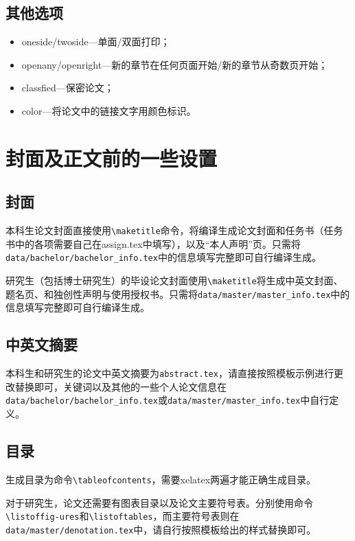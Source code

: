 \subsection{其他选项}
    \begin{itemize}
        \item oneside\slash twoside---单面\slash 双面打印；
        \item openany\slash openright---新的章节在任何页面开始\slash 新的章节从奇数页开始；
        \item classfied---保密论文；
        \item color---将论文中的链接文字用颜色标识。
    \end{itemize}

\section{封面及正文前的一些设置}
\subsection{封面}
本科生论文封面直接使用\texttt{\textbackslash maketitle}命令，将编译生成论文封面和任务书（任务书中的各项需要自己在assign.tex中填写），以及“本人声明”页。只需将\texttt{data/bachelor/bachelor\_info.tex}中的信息填写完整即可自行编译生成。

研究生（包括博士研究生）的毕设论文封面使用\texttt{\textbackslash maketitle}将生成中英文封面、题名页、和独创性声明与使用授权书。只需将\texttt{data/master/master\_info.tex}中的信息填写完整即可自行编译生成。

\subsection{中英文摘要}
本科生和研究生的论文中英文摘要为\texttt{abstract.tex}，请直接按照模板示例进行更改替换即可，关键词以及其他的一些个人论文信息在\texttt{data/bachelor/bachelor\_info.tex}或\texttt{data/master/master\_info.tex}中自行定义。

\subsection{目录}
生成目录为命令\texttt{\textbackslash tableofcontents}，需要xelatex两遍才能正确生成目录。

对于研究生，论文还需要有图表目录以及论文主要符号表。分别使用命令\texttt{\textbackslash listoffig\hyp{}ures}和\texttt{\textbackslash listoftables}，而主要符号表则在\texttt{data/master/denotation.tex}中，请自行按照模板给出的样式替换即可。

